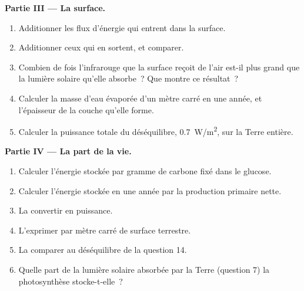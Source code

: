 \begin{problem}
\medskip
\noindent\textbf{Partie III --- La surface.}
\begin{enumerate}[resume]
  \item Additionner les flux d'énergie qui entrent dans la surface.
  \item Additionner ceux qui en sortent, et comparer.
  \item Combien de fois l'infrarouge que la surface reçoit de l'air
        est-il plus grand que la lumière solaire qu'elle absorbe~? Que
        montre ce résultat~?
  \item Calculer la masse d'eau évaporée d'un mètre carré en une année, et
        l'épaisseur de la couche qu'elle forme.
  \item Calculer la puissance totale du déséquilibre, \qty{0.7}{W/m^2},
        sur la Terre entière.
\end{enumerate}

\medskip
\noindent\textbf{Partie IV --- La part de la vie.}
\begin{enumerate}[resume]
  \item Calculer l'énergie stockée par gramme de carbone fixé dans le
        glucose.
  \item Calculer l'énergie stockée en une année par la production primaire
        nette.
  \item La convertir en puissance.
  \item L'exprimer par mètre carré de surface terrestre.
  \item La comparer au déséquilibre de la question 14.
  \item Quelle part de la lumière solaire absorbée par la Terre
        (question 7) la photosynthèse stocke-t-elle~?
\end{enumerate}
\end{problem}
